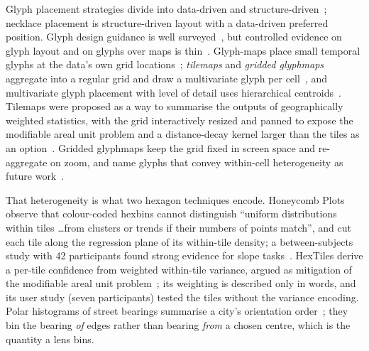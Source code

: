 Glyph placement strategies divide into data-driven and
structure-driven~\cite{ward2002taxonomy}; necklace placement is structure-driven
layout with a data-driven preferred position. Glyph design guidance is well
surveyed~\cite{borgo2013glyph}, but controlled evidence on glyph layout and on
glyphs over maps is thin~\cite{fuchs2017glyph}. Glyph-maps place small temporal
glyphs at the data's own grid locations~\cite{wickham2012glyphmaps};
\emph{tilemaps} and \emph{gridded glyphmaps} aggregate into a regular grid and
draw a multivariate glyph per cell~\cite{slingsby2018tilemaps,slingsby2023gridded,
laksono2024gridded}, and multivariate glyph placement with level of detail uses
hierarchical centroids~\cite{mcnabb2019multivariate}. Tilemaps were proposed as a
way to summarise the outputs of geographically weighted statistics, with the
grid interactively resized and panned to expose the modifiable areal unit
problem and a distance-decay kernel larger than the tiles as an
option~\cite{slingsby2018tilemaps}. Gridded glyphmaps keep the grid fixed in screen
space and re-aggregate on zoom, and name glyphs that convey within-cell
heterogeneity as future work~\cite{slingsby2023gridded}.

That heterogeneity is what two hexagon techniques encode. Honeycomb Plots
observe that colour-coded hexbins cannot distinguish ``uniform distributions
within tiles \ldots from clusters or trends if their numbers of points match'',
and cut each tile along the regression plane of its within-tile density; a
between-subjects study with 42 participants found strong evidence for slope
tasks~\cite{trautner2022honeycomb}. HexTiles derive a per-tile confidence from
weighted within-tile variance, argued as mitigation of the modifiable areal unit
problem~\cite{kawakami2024hextiles}; its weighting is described only in words,
and its user study (seven participants) tested the tiles without the variance
encoding. Polar histograms of street bearings summarise a city's orientation
order~\cite{boeing2019urban}; they bin the bearing \emph{of} edges rather than
bearing \emph{from} a chosen centre, which is the quantity a lens bins.

